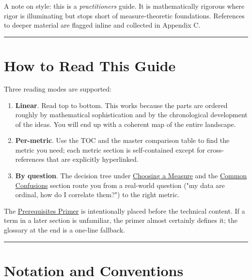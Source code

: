 \documentclass{article}
\providecommand{\tightlist}{\setlength{\itemsep}{0pt}\setlength{\parskip}{0pt}}
\let\oldsection\section
\renewcommand{\section}{\clearpage\oldsection}
\begin{document}
A note on style: this is a \emph{practitioner\textquotesingle s} guide.
It is mathematically rigorous where rigor is illuminating but stops
short of measure-theoretic foundations. References to deeper material
are flagged inline and collected in Appendix C.

\begin{center}\rule{0.5\linewidth}{0.5pt}\end{center}

\section{How to Read This Guide}\label{how-to-read-this-guide}

Three reading modes are supported:

\begin{enumerate}
\def\labelenumi{\arabic{enumi}.}
\tightlist
\item
  \textbf{Linear}. Read top to bottom. This works because the parts are
  ordered roughly by mathematical sophistication and by the
  chronological development of the ideas. You will end up with a
  coherent map of the entire landscape.
\item
  \textbf{Per-metric}. Use the TOC and the master comparison table to
  find the metric you need; each metric section is self-contained except
  for cross-references that are explicitly hyperlinked.
\item
  \textbf{By question}. The decision tree under
  \hyperref[cross-cutting-themes]{Choosing a Measure} and the
  \hyperref[common-confusions-and-how-to-resolve-them]{Common
  Confusions} section route you from a real-world question ("my data are
  ordinal, how do I correlate them?") to the right metric.
\end{enumerate}

The \hyperref[prerequisites-primer]{Prerequisites Primer} is
intentionally placed before the technical content. If a term in a later
section is unfamiliar, the primer almost certainly defines it; the
glossary at the end is a one-line fallback.

\begin{center}\rule{0.5\linewidth}{0.5pt}\end{center}

\section{Notation and Conventions}\label{notation-and-conventions}
\end{document}
